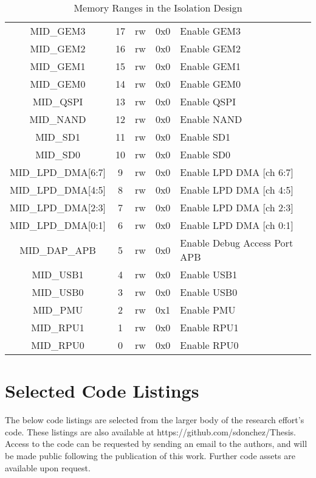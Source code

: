 \begin{table}[ht!]
\begin{tabular}{|c|c|c|c|l|}
        \\
      MID\_GEM3 & 17 & rw & 0x0 & Enable GEM3 \\
      MID\_GEM2 & 16 & rw & 0x0 & Enable GEM2 \\
      MID\_GEM1 & 15 & rw & 0x0 & Enable GEM1 \\
      MID\_GEM0 & 14 & rw & 0x0 & Enable GEM0 \\
      MID\_QSPI & 13 & rw & 0x0 & Enable QSPI \\
      MID\_NAND & 12 & rw & 0x0 & Enable NAND \\
      MID\_SD1 & 11 & rw & 0x0 & Enable SD1 \\
      MID\_SD0 & 10 & rw & 0x0 & Enable SD0 \\
      MID\_LPD\_DMA[6:7] & 9 & rw & 0x0 & Enable LPD DMA [ch 6:7] \\
      MID\_LPD\_DMA[4:5] & 8 & rw & 0x0 & Enable LPD DMA [ch 4:5] \\
      MID\_LPD\_DMA[2:3] & 7 & rw & 0x0 & Enable LPD DMA [ch 2:3] \\
      MID\_LPD\_DMA[0:1] & 6 & rw & 0x0 & Enable LPD DMA [ch 0:1] \\
      MID\_DAP\_APB & 5 & rw & 0x0 & Enable Debug Access Port APB \\
      MID\_USB1 & 4 & rw & 0x0 & Enable USB1 \\
      MID\_USB0 & 3 & rw & 0x0 & Enable USB0 \\
      MID\_PMU & 2 & rw & 0x1 & Enable PMU \\
      MID\_RPU1 & 1 & rw & 0x0 & Enable RPU1 \\
      MID\_RPU0 & 0 & rw & 0x0 & Enable RPU0 \\
      \hline
  \end{tabular}
  \caption{Memory Ranges in the Isolation Design}
  \label{table:XMPU_PL_AXI_Masters}
\end{table}

\chapter{Selected Code Listings}\label{apx:code-listings}
The below code listings are selected from the larger body of the research effort's code. These listings are also available at https://github.com/sdonchez/Thesis. Access to the code can be requested by sending an email to the authors, and will be made public following the publication of this work. Further code assets are available upon request.


\newpage

\newpage

\newpage

